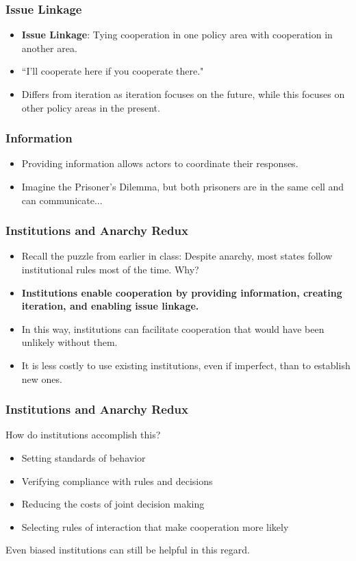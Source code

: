 \documentclass[handout]{beamer}
\begin{document}
\begin{frame} 
	\frametitle{\LARGE{Issue Linkage}}
	\begin{itemize}
		\item \textbf{Issue Linkage}: Tying cooperation in one policy area with cooperation in another area.		
		\item ``I'll cooperate here if you cooperate there." \pause
		\item Differs from iteration as iteration focuses on the future, while this focuses on other policy areas in the present.
	\end{itemize}
\end{frame}

\begin{frame} 
	\frametitle{\LARGE{Information}}
	\begin{itemize}
		\item Providing information allows actors to coordinate their responses. \pause
		\item Imagine the Prisoner's Dilemma, but both prisoners are in the same cell and can communicate...
	\end{itemize}
\end{frame}

\begin{frame} 
	\frametitle{\LARGE{Institutions and Anarchy Redux}}	
	\begin{itemize}
		\item Recall the puzzle from earlier in class: Despite anarchy, most states follow institutional rules most of the time. Why? \pause
		\item \textbf{Institutions enable cooperation by providing information, creating iteration, and enabling issue linkage.} \pause
		\item In this way, institutions can facilitate cooperation that would have been unlikely without them. \pause
		\item It is less costly to use existing institutions, even if imperfect, than to establish new ones.	
	\end{itemize}
\end{frame}

\begin{frame} 
	\frametitle{\LARGE{Institutions and Anarchy Redux}}	
	How do institutions accomplish this? \pause
	\begin{itemize}
		\item Setting standards of behavior
		\item Verifying compliance with rules and decisions
		\item Reducing the costs of joint decision making
		\item Selecting rules of interaction that make cooperation more likely	
	\end{itemize}
	Even biased institutions can still be helpful in this regard.
\end{frame}
\end{document}
